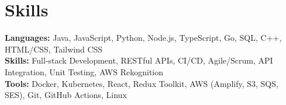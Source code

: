 \documentclass[11pt]{article}       %
\begin{document}

\vspace{-18.5pt}

\section*{Skills}
\textbf{Languages:} Java, JavaScript, Python, Node.js, TypeScript, Go, SQL, C++, HTML/CSS, Tailwind CSS\\
\textbf{Skills:} Full-stack Development, RESTful APIs, CI/CD, Agile/Scrum, API Integration, Unit Testing, AWS Rekognition\\
\textbf{Tools:} Docker, Kubernetes, React, Redux Toolkit, AWS (Amplify, S3, SQS, SES), Git, GitHub Actions, Linux\\

\vspace{-6.5pt}
\end{document}
